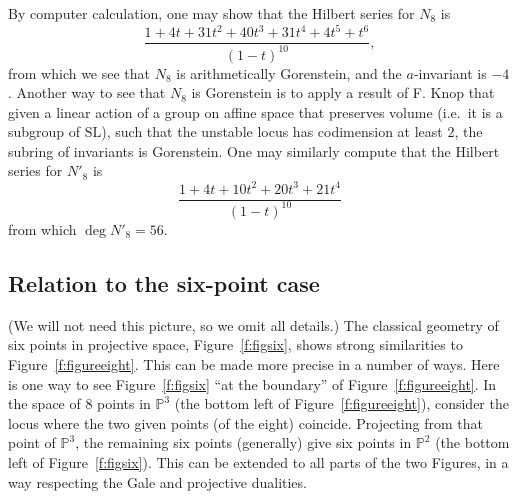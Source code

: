\documentclass{amsart}
\newcommand{\cut}[1]{}
\theoremstyle{definition}
\theoremstyle{remark}
\def\SL{\mathrm{SL}}
\def\proj{\mathbb{P}}
\begin{document}
By computer calculation, one may show that \cut{Ben  July 12, 2010 e}the  Hilbert series for $N_8$
is
\begin{displaymath}
\frac{1 + 4 t + 31 t^2 + 40 t^3 + 31 t^4 + 4 t^5 + t^6}{(1-t)^{10}},
\end{displaymath}
from which we see that $N_8$ is arithmetically Gorenstein, and the
$a$-invariant is $-4$.    
Another way to see that $N_8$ is Gorenstein is to apply a result of
F. Knop \cite{knop} that given a linear action of a group on affine
space that  preserves volume (i.e.\ it is a subgroup of
$\SL$),  such that  the unstable locus has
codimension at least $2$,   the subring of invariants is
Gorenstein.\cut{Ben Jul 13.  I've got text up front.  (Knop also
shows that the $a$-invariant for $n$ equally weighted points in
$\proj^m$ is $-\gcd(n,m+1)$, which explains the $a$-invariants of $-2$
and $-4$ above.)}
One may similarly compute that the Hilbert series for $N'_8$ is 
$$
\frac { 1 + 4 t + 10 t^2 + 20 t^3 + 21 t^4} { (1-t)^{10}}
$$ from which   $\deg N'_8 = 56$.

\subsection{Relation to the six-point case}
\label{s:relationtosix}

(We will not need this picture, so we omit all details.)  The classical geometry of six points in projective space,
Figure~\ref{f:figsix}, shows strong similarities to Figure~\ref{f:figureeight}.  This can be made more precise in a
number of ways.  Here is one way to see Figure~\ref{f:figsix} ``at the boundary'' of Figure~\ref{f:figureeight}.  In
the space of 8 points in $\proj^3$ (the bottom left of Figure~\ref{f:figureeight}), consider the locus where the two
given points (of the eight) coincide.  Projecting from that point of $\proj^3$, the remaining six points (generally)
give six points in $\proj^2$ (the bottom left of Figure~\ref{f:figsix}).  This can be extended to all parts of the two
Figures, in a way respecting the Gale and projective dualities.   
\end{document}
